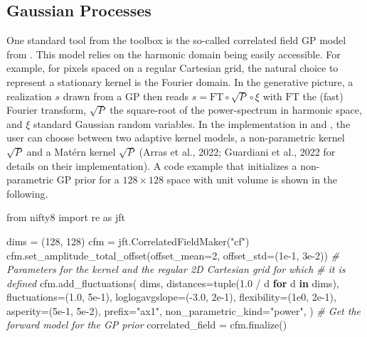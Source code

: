 \documentclass[10pt,a4paper,onecolumn]{article}
\let\textttOrig=\texttt
\def\texttt#1{\expandafter\textttOrig{\seqsplit{#1}}}
\newenvironment{Shaded}{}{}
\newcommand{\BuiltInTok}[1]{#1}
\newcommand{\CommentTok}[1]{\textcolor[rgb]{0.38,0.63,0.69}{\textit{#1}}}
\newcommand{\ControlFlowTok}[1]{\textcolor[rgb]{0.00,0.44,0.13}{\textbf{#1}}}
\newcommand{\DecValTok}[1]{\textcolor[rgb]{0.25,0.63,0.44}{#1}}
\newcommand{\FloatTok}[1]{\textcolor[rgb]{0.25,0.63,0.44}{#1}}
\newcommand{\ImportTok}[1]{#1}
\newcommand{\KeywordTok}[1]{\textcolor[rgb]{0.00,0.44,0.13}{\textbf{#1}}}
\newcommand{\NormalTok}[1]{#1}
\newcommand{\OperatorTok}[1]{\textcolor[rgb]{0.40,0.40,0.40}{#1}}
\newcommand{\StringTok}[1]{\textcolor[rgb]{0.25,0.44,0.63}{#1}}
\begin{document}
\hypertarget{gaussian-processes}{%
\subsection{Gaussian Processes}\label{gaussian-processes}}

One standard tool from the \texttt{NIFTy.re} toolbox is the so-called
correlated field GP model from \texttt{NIFTy}. This model relies on the
harmonic domain being easily accessible. For example, for pixels spaced
on a regular Cartesian grid, the natural choice to represent a
stationary kernel is the Fourier domain. In the generative picture, a
realization \(s\) drawn from a GP then reads
\(s = \mathrm{FT} \circ \sqrt{P} \circ \xi\) with \(\mathrm{FT}\) the
(fast) Fourier transform, \(\sqrt{P}\) the square-root of the
power-spectrum in harmonic space, and \(\xi\) standard Gaussian random
variables. In the implementation in \texttt{NIFTy.re} and
\texttt{NIFTy}, the user can choose between two adaptive kernel models,
a non-parametric kernel \(\sqrt{P}\) and a Matérn kernel \(\sqrt{P}\)
(Arras et al., 2022; Guardiani et al., 2022 for details on their
implementation). A code example that initializes a non-parametric GP
prior for a \(128 \times 128\) space with unit volume is shown in the
following.

\begin{Shaded}
\begin{Highlighting}[]
\ImportTok{from}\NormalTok{ nifty8 }\ImportTok{import}\NormalTok{ re }\ImportTok{as}\NormalTok{ jft}

\NormalTok{dims }\OperatorTok{=}\NormalTok{ (}\DecValTok{128}\NormalTok{, }\DecValTok{128}\NormalTok{)}
\NormalTok{cfm }\OperatorTok{=}\NormalTok{ jft.CorrelatedFieldMaker(}\StringTok{"cf"}\NormalTok{)}
\NormalTok{cfm.set\_amplitude\_total\_offset(offset\_mean}\OperatorTok{=}\DecValTok{2}\NormalTok{, offset\_std}\OperatorTok{=}\NormalTok{(}\FloatTok{1e{-}1}\NormalTok{, }\FloatTok{3e{-}2}\NormalTok{))}
\CommentTok{\# Parameters for the kernel and the regular 2D Cartesian grid for which}
\CommentTok{\# it is defined}
\NormalTok{cfm.add\_fluctuations(}
\NormalTok{  dims,}
\NormalTok{  distances}\OperatorTok{=}\BuiltInTok{tuple}\NormalTok{(}\FloatTok{1.0} \OperatorTok{/}\NormalTok{ d }\ControlFlowTok{for}\NormalTok{ d }\KeywordTok{in}\NormalTok{ dims),}
\NormalTok{  fluctuations}\OperatorTok{=}\NormalTok{(}\FloatTok{1.0}\NormalTok{, }\FloatTok{5e{-}1}\NormalTok{),}
\NormalTok{  loglogavgslope}\OperatorTok{=}\NormalTok{(}\OperatorTok{{-}}\FloatTok{3.0}\NormalTok{, }\FloatTok{2e{-}1}\NormalTok{),}
\NormalTok{  flexibility}\OperatorTok{=}\NormalTok{(}\FloatTok{1e0}\NormalTok{, }\FloatTok{2e{-}1}\NormalTok{),}
\NormalTok{  asperity}\OperatorTok{=}\NormalTok{(}\FloatTok{5e{-}1}\NormalTok{, }\FloatTok{5e{-}2}\NormalTok{),}
\NormalTok{  prefix}\OperatorTok{=}\StringTok{"ax1"}\NormalTok{,}
\NormalTok{  non\_parametric\_kind}\OperatorTok{=}\StringTok{"power"}\NormalTok{,}
\NormalTok{)}
\CommentTok{\# Get the forward model for the GP prior}
\NormalTok{correlated\_field }\OperatorTok{=}\NormalTok{ cfm.finalize()}
\end{Highlighting}
\end{Shaded}
\end{document}
